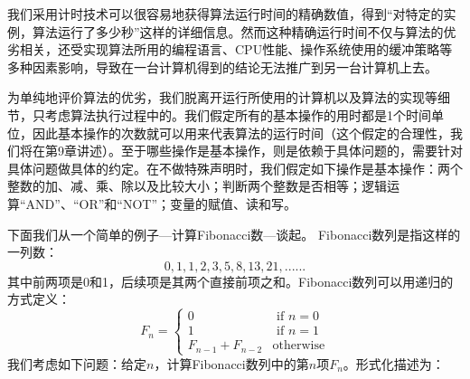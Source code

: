 	  我们采用计时技术可以很容易地获得算法运行时间的精确数值，得到“对特定的实例，算法运行了多少秒”这样的详细信息。然而这种精确运行时间不仅与算法的优劣相关，还受实现算法所用的编程语言、CPU性能、操作系统使用的缓冲策略等多种因素影响，导致在一台计算机得到的结论无法推广到另一台计算机上去。
	  
	  为单纯地评价算法的优劣，我们脱离开运行所使用的计算机以及算法的实现等细节，只考虑算法执行过程中的。我们假定所有的基本操作的用时都是1个时间单位，因此基本操作的次数就可以用来代表算法的运行时间（这个假定的合理性，我们将在第9章讲述）。至于哪些操作是基本操作，则是依赖于具体问题的，需要针对具体问题做具体的约定。在不做特殊声明时，我们假定如下操作是基本操作：两个整数的加、减、乘、除以及比较大小；判断两个整数是否相等；逻辑运算“{\sc AND}”、“{\sc OR}”和“{\sc NOT}”；变量的赋值、读和写。
	
	
	下面我们从一个简单的例子---计算Fibonacci数---谈起。
		Fibonacci数列是指这样的一列数：
\[
	0, 1, 1, 2, 3, 5, 8, 13, 21, ...... 
\]	
其中前两项是0和1，后续项是其两个直接前项之和。Fibonacci数列可以用递归的方式定义：
\[
	F_{n} = \begin{cases} 
				0 & \text{ if } n = 0 \nonumber \\ 
				1  & \text{ if } n = 1 \nonumber \\
				F_{n-1} + F_{n-2} & \text{otherwise} \nonumber
			\end{cases}
\]
	我们考虑如下问题：给定$n$，计算Fibonacci数列中的第$n$项$F_{n}$。形式化描述为：
\begin{center}
\end{center}
	
